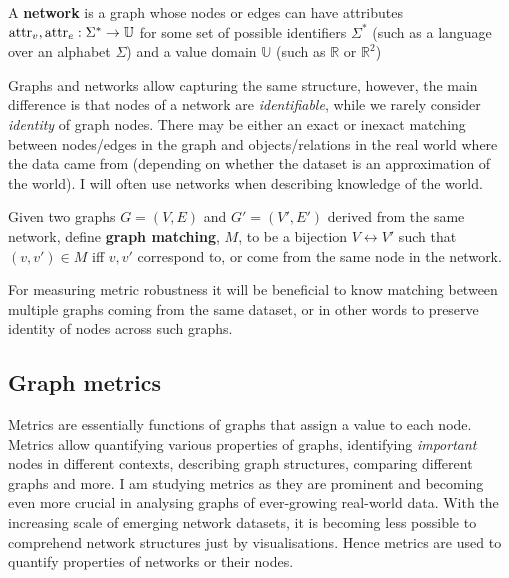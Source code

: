 \begin{definition}[Network]
    A \textbf{network} is a graph whose nodes or edges can have attributes $\textnormal{attr}_v, \textnormal{attr}_e : \Sigma^* \rightarrow \mathbb{U}$ for some set of possible identifiers $\Sigma^*$ (such as a language over an alphabet $\Sigma$) and a value domain $\mathbb{U}$ (such as $\mathbb{R}$ or $\mathbb{R}^2$)
\end{definition}

Graphs and networks allow capturing the same structure, however, the main difference is that nodes of a network are \textit{identifiable}, while we rarely consider \textit{identity} of graph nodes.
There may be either an exact or inexact matching between nodes/edges in the graph and objects/relations in the real world where the data came from (depending on whether the dataset is an approximation of the world).
I will often use networks when describing knowledge of the world.

\begin{definition}
    Given two graphs $G = (V, E)$ and $G' = (V', E')$ derived from the same network, define \textbf{graph matching}, $M$, to be a bijection $V \leftrightarrow V'$ such that $(v, v') \in M$ iff $v, v'$ correspond to, or come from the same node in the network.
\end{definition}

For measuring metric robustness it will be beneficial to know matching between multiple graphs coming from the same dataset, or in other words to preserve identity of nodes across such graphs.

\subsection{Graph metrics}

Metrics are essentially functions of graphs that assign a value to each node.
Metrics allow quantifying various properties of graphs, identifying \textit{important} nodes in different contexts, describing graph structures, comparing different graphs and more.
I am studying metrics as they are prominent and becoming even more crucial in analysing graphs of ever-growing real-world data.
With the increasing scale of emerging network datasets, it is becoming less possible to comprehend network structures just by visualisations.
Hence metrics are used to quantify properties of networks or their nodes.


